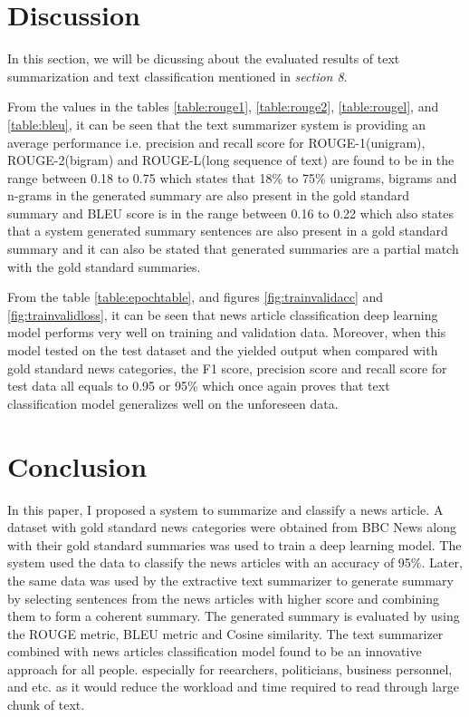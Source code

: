 \documentclass[a4paper,4pt]{article}
\begin{document}
\section{Discussion}
In this section, we will be dicussing about the evaluated results of text summarization and text classification mentioned in
\textit{section 8}. \\ \par
From the values in the tables \ref{table:rouge1}, 
\ref{table:rouge2}, \ref{table:rougel}, and \ref{table:bleu}, it can be seen that the text summarizer
system is providing an average performance i.e. precision and recall score for ROUGE-1(unigram), ROUGE-2(bigram) and ROUGE-L(long sequence of text) are 
found to be in the range between 0.18 to 0.75 which states that 18\% to 75\% unigrams, bigrams and n-grams in the generated summary are also
present in the gold standard summary and BLEU score is in the range between 0.16 to 0.22 which also states that a system generated summary
sentences are also present in a gold standard summary and it can also be stated that generated summaries are a partial match with the 
gold standard summaries. \\
\par
From the table \ref{table:epochtable}, and figures \ref{fig:trainvalidacc} and \ref{fig:trainvalidloss}, it can be seen that 
news article classification deep learning model performs very well on training and validation data. 
Moreover, when this model tested on the test dataset and the yielded output when compared with gold standard news categories,
the F1 score, precision score and recall score for test data all equals to 0.95 or 95\% which once again proves that text 
classification model generalizes well on the unforeseen data.

\section{Conclusion}
In this paper, I proposed a system to summarize and classify a news article. A dataset with gold standard news categories
were obtained from BBC News along with their gold standard summaries was used to train a deep learning model. The system used the 
data to classify the news articles with an accuracy of 95\%. Later, the same data was used by the extractive text summarizer
to generate summary by selecting sentences from the news articles with higher score and combining them to form a coherent summary.
The generated summary is evaluated by using the ROUGE metric, BLEU metric and Cosine similarity.
The text summarizer combined with news articles classification model found to be an innovative approach for all people.
especially for reearchers, politicians, business personnel, and etc. as it would reduce the workload and time required to read through 
large chunk of text. 
\end{document}
